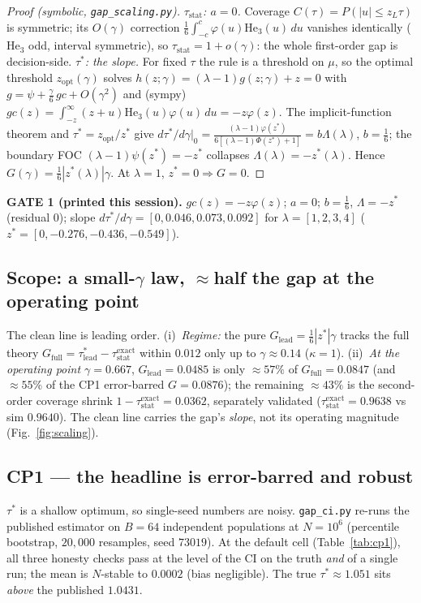 \documentclass[11pt]{article}
\theoremstyle{plain}
\theoremstyle{definition}
\newcommand{\taustat}{\tau_{\mathrm{stat}}}
\newcommand{\taustar}{\tau^{*}}
\newcommand{\He}{\mathrm{He}}
\begin{document}
\begin{proof}[Proof (symbolic, \texttt{gap\_scaling.py})]
\emph{$\taustat$: $a=0$.} Coverage $C(\tau)=P(|u|\le z_L\tau)$ is symmetric; its $O(\gamma)$ correction
$\tfrac16\int_{-c}^{c}\varphi(u)\He_3(u)\,du$ vanishes identically ($\He_3$ odd, interval symmetric), so
$\taustat=1+o(\gamma)$: the whole first-order gap is decision-side.
\emph{$\taustar$: the slope.} For fixed $\tau$ the rule is a threshold on $\mu$, so the optimal
threshold $z_{\mathrm{opt}}(\gamma)$ solves $h(z;\gamma)=(\lambda-1)g(z;\gamma)+z=0$ with
$g=\psi+\tfrac{\gamma}{6}\,gc+O(\gamma^2)$ and (sympy) $gc(z)=\int_{-z}^{\infty}(z+u)\He_3(u)\varphi(u)\,du=-z\varphi(z)$.
The implicit-function theorem and $\taustar=z_{\mathrm{opt}}/z^*$ give
$d\taustar/d\gamma|_0=\tfrac{(\lambda-1)\varphi(z^*)}{6[(\lambda-1)\Phi(z^*)+1]}=b\Lambda(\lambda)$,
$b=\tfrac16$; the boundary FOC $(\lambda-1)\psi(z^*)=-z^*$ collapses $\Lambda(\lambda)=-z^*(\lambda)$.
Hence $G(\gamma)=\tfrac16|z^*(\lambda)|\gamma$. At $\lambda=1$, $z^*=0\Rightarrow G=0$.
\end{proof}

\noindent\textbf{GATE 1 (printed this session).} $gc(z)=-z\varphi(z)$; $a=0$; $b=\tfrac16$,
$\Lambda=-z^*$ (residual $0$); slope $d\taustar/d\gamma=[0,0.046,0.073,0.092]$ for $\lambda=[1,2,3,4]$
($z^*=[0,-0.276,-0.436,-0.549]$).

\subsection{Scope: a small-$\gamma$ law, $\approx$half the gap at the operating point}
The clean line is leading order. (i)~\emph{Regime:} the pure $G_{\mathrm{lead}}=\tfrac16|z^*|\gamma$
tracks the full theory $G_{\mathrm{full}}=\taustar_{\mathrm{lead}}-\taustat^{\mathrm{exact}}$ within
$0.012$ only up to $\gamma\approx0.14$ ($\kappa{=}1$). (ii)~\emph{At the operating point $\gamma=0.667$},
$G_{\mathrm{lead}}=0.0485$ is only $\approx 57\%$ of $G_{\mathrm{full}}=0.0847$ (and $\approx 55\%$ of the
CP1 error-barred $G=0.0876$); the remaining $\approx 43\%$ is the second-order coverage shrink
$1-\taustat^{\mathrm{exact}}=0.0362$, separately validated ($\taustat^{\mathrm{exact}}=0.9638$ vs sim
$0.9640$). The clean line carries the gap's \emph{slope}, not its operating magnitude
(Fig.~\ref{fig:scaling}).

\subsection{CP1 --- the headline is error-barred and robust}
$\taustar$ is a shallow optimum, so single-seed numbers are noisy. \texttt{gap\_ci.py} re-runs the
published estimator on $B=64$ independent populations at $N=10^6$ (percentile bootstrap, $20{,}000$
resamples, seed $73019$). At the default cell (Table~\ref{tab:cp1}), all three honesty checks pass at
the level of the CI on the truth \emph{and} of a single run; the mean is $N$-stable to $0.0002$ (bias
negligible). The true $\taustar\approx1.051$ sits \emph{above} the published $1.0431$.
\end{document}
